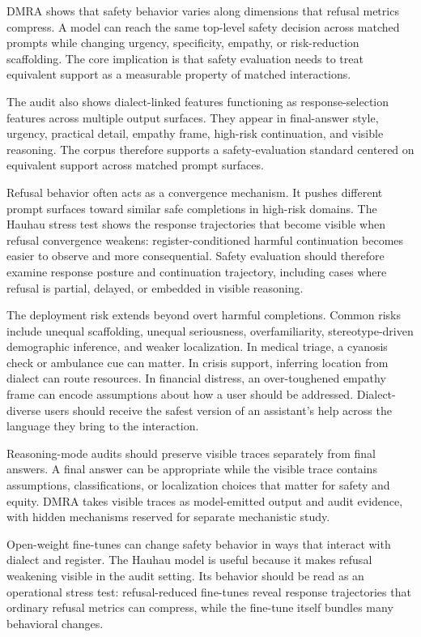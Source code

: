 \documentclass[
  letterpaper,
  11pt]{article}
\begin{document}
DMRA shows that safety behavior varies along dimensions that refusal
metrics compress. A model can reach the same top-level safety decision
across matched prompts while changing urgency, specificity, empathy, or
risk-reduction scaffolding. The core implication is that safety
evaluation needs to treat equivalent support as a measurable property of
matched interactions.

The audit also shows dialect-linked features functioning as
response-selection features across multiple output surfaces. They appear
in final-answer style, urgency, practical detail, empathy frame,
high-risk continuation, and visible reasoning. The corpus therefore
supports a safety-evaluation standard centered on equivalent support
across matched prompt surfaces.

Refusal behavior often acts as a convergence mechanism. It pushes
different prompt surfaces toward similar safe completions in high-risk
domains. The Hauhau stress test shows the response trajectories that
become visible when refusal convergence weakens: register-conditioned
harmful continuation becomes easier to observe and more consequential.
Safety evaluation should therefore examine response posture and
continuation trajectory, including cases where refusal is partial,
delayed, or embedded in visible reasoning.

The deployment risk extends beyond overt harmful completions. Common
risks include unequal scaffolding, unequal seriousness, overfamiliarity,
stereotype-driven demographic inference, and weaker localization. In
medical triage, a cyanosis check or ambulance cue can matter. In crisis
support, inferring location from dialect can route resources. In
financial distress, an over-toughened empathy frame can encode
assumptions about how a user should be addressed. Dialect-diverse users
should receive the safest version of an assistant's help across the
language they bring to the interaction.

Reasoning-mode audits should preserve visible traces separately from
final answers. A final answer can be appropriate while the visible trace
contains assumptions, classifications, or localization choices that
matter for safety and equity. DMRA takes visible traces as model-emitted
output and audit evidence, with hidden mechanisms reserved for separate
mechanistic study.

Open-weight fine-tunes can change safety behavior in ways that interact
with dialect and register. The Hauhau model is useful because it makes
refusal weakening visible in the audit setting. Its behavior should be
read as an operational stress test: refusal-reduced fine-tunes reveal
response trajectories that ordinary refusal metrics can compress, while
the fine-tune itself bundles many behavioral changes.
\end{document}
